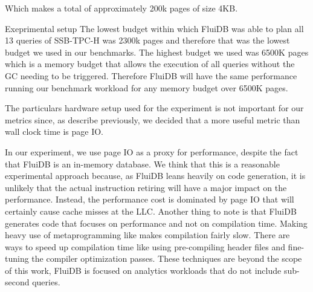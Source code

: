 Which makes a total of approximately 200k pages of size 4KB.

\begin{correction}{Exeprimental setup}
  The lowest budget within which FluiDB was able to plan all 13
  queries of SSB-TPC-H was 2300k pages and therefore that was the
  lowest budget we used in our benchmarks. The highest budget we used
  was 6500K pages which is a memory budget that allows the execution
  of all queries without the GC needing to be triggered. Therefore
  FluiDB will have the same performance running our benchmark workload
  for any memory budget over 6500K pages.

  The particulars hardware setup used for the experiment is not
  important for our metrics since, as describe previously, we decided
  that a more useful metric than wall clock time is page IO.
\end{correction}

In our experiment, we use page IO as a proxy for performance, despite
the fact that FluiDB is an in-memory database. We think that this is a
reasonable experimental approach because, as FluiDB leans heavily on
code generation, it is unlikely that the actual instruction retiring
will have a major impact on the performance. Instead, the performance
cost is dominated by page IO that will certainly cause cache misses at
the LLC. Another thing to note is that FluiDB generates code that
focuses on performance and not on compilation time. Making heavy use
of metaprogramming like  makes compilation fairly
slow. There are ways to speed up compilation time like using
pre-compiling header files \cite{PrecompiledHeadersPCH} and
fine-tuning the compiler optimization passes. These techniques are
beyond the scope of this work, FluiDB is focused on analytics
workloads that do not include sub-second queries.

